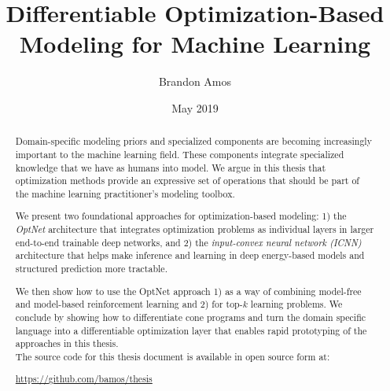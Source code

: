 \documentclass[12pt]{cmuthesis}
\begin{document}
\frontmatter

\pagestyle{empty}

\title{{\bf Differentiable Optimization-Based Modeling for Machine Learning}}
\author{Brandon Amos}
\date{May 2019}


\support{}
\disclaimer{}


\maketitle


\begin{abstract}
  Domain-specific modeling priors and specialized components are
  becoming increasingly important to the machine learning field.
  These components integrate specialized knowledge that we have
  as humans into model.
  We argue in this thesis that optimization methods provide an
  expressive set of operations that should be part of the
  machine learning practitioner's modeling toolbox.

  We present two foundational approaches for optimization-based modeling:
  1) the \emph{OptNet} architecture that integrates
  optimization problems as individual layers in larger end-to-end
  trainable deep networks, and
  2) the \emph{input-convex neural network (ICNN)}
  architecture that helps make inference and learning in deep
  energy-based models and structured prediction more tractable.

  We then show how to use the OptNet approach
  1) as a way of combining model-free and model-based reinforcement
  learning and
  2) for top-$k$ learning problems.
  We conclude by showing how to differentiate cone programs
  and turn the \cvxpy domain specific language into
  a differentiable optimization layer that enables rapid prototyping of
  the approaches in this thesis. \\

  \noindent
  The source code for this thesis document is available in open source form at:
  \begin{center}
  \url{https://github.com/bamos/thesis}
  \end{center}
\end{abstract}
\end{document}

